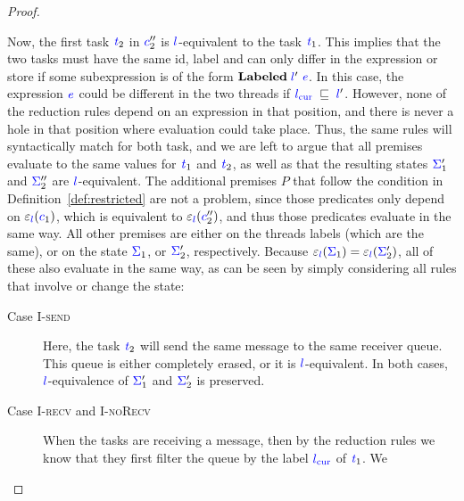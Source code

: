 \documentclass{llncs}
\newcommand{\Varid}[1]{\mathit{#1}}
\begin{document}
\begin{proof}
\begin{itemize}
    Now, the first task \ensuremath{\ifc{\Varid{t}}_{2}} in \ensuremath{\ifc{c}_{2}''} is \ensuremath{\ifc{l}}-equivalent to the task \ensuremath{\ifc{\Varid{t}}_{1}}.
    This implies that the two tasks must have the same id, label and
    can only differ in the expression or store if some subexpression
    is of the form \ensuremath{\mathbf{Labeled}\;\ifc{l}'\;\ifc{\Varid{e}}}.  In this case, the expression \ensuremath{\ifc{\Varid{e}}} could
    be different in the two threads if \ensuremath{\lcurr\;\flows{}\;\ifc{l}'}.  However, none of the reduction rules
    depend on an expression in that position, and there is never a
    hole in that position
    where evaluation could take place.  Thus, the same rules will syntactically
    match for both task, and we are left to argue that all premises
    evaluate to the same values for \ensuremath{\ifc{\Varid{t}}_{1}} and \ensuremath{\ifc{\Varid{t}}_{2}}, as well as that
    the resulting states \ensuremath{\ifc{\Sigma}_{1}'} and
    \ensuremath{\ifc{\Sigma}_{2}''} are \ensuremath{\ifc{l}}-equivalent.
    The additional premises $P$ that follow
    the condition in Definition~\ref{def:restricted} are not a problem,
    since those
    predicates only depend on \ensuremath{\varepsilon_{\ifc{l}}(\ifc{c}_{1})}, which is equivalent
    to \ensuremath{\varepsilon_{\ifc{l}}(\ifc{c}_{2}'')}, and thus those predicates evaluate in the same way.
    All other premises are either on the threads labels (which are the same),
    or on the state \ensuremath{\ifc{\Sigma}_{1}}, or \ensuremath{\ifc{\Sigma}_{2}'}, respectively.  Because
    \ensuremath{\varepsilon_{\ifc{l}}(\ifc{\Sigma}_{1})\mathrel{=}\varepsilon_{\ifc{l}}(\ifc{\Sigma}_{2}')}, all of these also evaluate in the same way,
    as can be seen by simply considering all rules that involve or
    change the state:
    \begin{description}
      \item[Case \textsc{I-send}]
      Here, the task \ensuremath{\ifc{\Varid{t}}_{2}} will send the same message to the same
      receiver queue. This
      queue is either completely erased, or it is \ensuremath{\ifc{l}}-equivalent.  In both
      cases, \ensuremath{\ifc{l}}-equivalence of \ensuremath{\ifc{\Sigma}_{1}'} and \ensuremath{\ifc{\Sigma}_{2}'} is preserved.
      \item[Case \textsc{I-recv} and \textsc{I-noRecv}]
      When the tasks are receiving a message, then by the reduction rules
      we know that they first filter the queue by the label
      \ensuremath{\lcurr} of \ensuremath{\ifc{\Varid{t}}_{1}}.  We

\end{description}
\end{itemize}
\end{proof}
\end{document}
